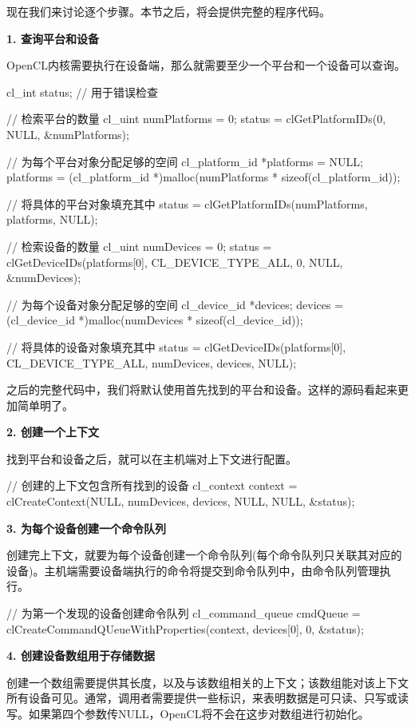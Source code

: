 现在我们来讨论逐个步骤。本节之后，将会提供完整的程序代码。

\textbf{1. 查询平台和设备}

OpenCL内核需要执行在设备端，那么就需要至少一个平台和一个设备可以查询。

\begin{codebox}[cpp]
cl_int status; // 用于错误检查

// 检索平台的数量
cl_uint numPlatforms = 0;
status = clGetPlatformIDs(0, NULL, &numPlatforms);

// 为每个平台对象分配足够的空间
cl_platform_id *platforms = NULL;
platforms = (cl_platform_id *)malloc(numPlatforms * sizeof(cl_platform_id));

// 将具体的平台对象填充其中
status = clGetPlatformIDs(numPlatforms, platforms, NULL);

// 检索设备的数量
cl_uint numDevices = 0;
status = clGetDeviceIDs(platforms[0], CL_DEVICE_TYPE_ALL, 0, NULL, &numDevices);

// 为每个设备对象分配足够的空间
cl_device_id *devices;
devices = (cl_device_id *)malloc(numDevices * sizeof(cl_device_id));

// 将具体的设备对象填充其中
status = clGetDeviceIDs(platforms[0], CL_DEVICE_TYPE_ALL, numDevices, devices, NULL);
\end{codebox}

之后的完整代码中，我们将默认使用首先找到的平台和设备。这样的源码看起来更加简单明了。

\textbf{2. 创建一个上下文}

找到平台和设备之后，就可以在主机端对上下文进行配置。

\begin{codebox}[cpp]
// 创建的上下文包含所有找到的设备
cl_context context = clCreateContext(NULL, numDevices, devices, NULL, NULL, &status);
\end{codebox}

\textbf{3. 为每个设备创建一个命令队列}

创建完上下文，就要为每个设备创建一个命令队列(每个命令队列只关联其对应的设备)。主机端需要设备端执行的命令将提交到命令队列中，由命令队列管理执行。

\begin{codebox}[cpp]
// 为第一个发现的设备创建命令队列
cl_command_queue cmdQueue = clCreateCommandQUeueWithProperties(context, devices[0], 0, &status);
\end{codebox}

\textbf{4. 创建设备数组用于存储数据}

创建一个数组需要提供其长度，以及与该数组相关的上下文；该数组能对该上下文所有设备可见。通常，调用者需要提供一些标识，来表明数据是可只读、只写或读写。如果第四个参数传NULL，OpenCL将不会在这步对数组进行初始化。

